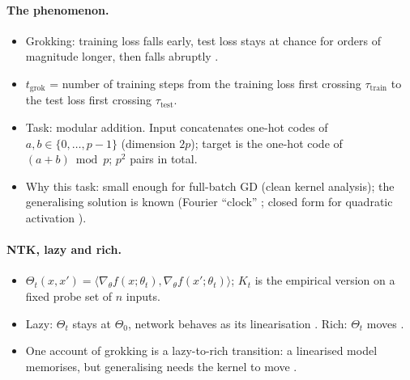 \documentclass[a4paper,11pt]{article} %
\newcommand{\tgrok}{t_{\mathrm{grok}}}
\begin{document}

\paragraph{The phenomenon.}
\begin{itemize}
	\item Grokking: training loss falls early, test loss stays at chance for
		orders of magnitude longer, then falls abruptly \citep{power2022grokking}.
	\item $\tgrok$ = number of training steps from the training loss first
		crossing $\tau_{\mathrm{train}}$ to the test loss first crossing
		$\tau_{\mathrm{test}}$.
	\item Task: modular addition. Input concatenates one-hot codes of
		$a,b\in\{0,\dots,p-1\}$ (dimension $2p$); target is the one-hot code of
		$(a+b)\bmod p$; $p^2$ pairs in total.
	\item Why this task: small enough for full-batch GD (clean kernel analysis);
		the generalising solution is known (Fourier ``clock''
		\citep{nanda2023progress}; closed form for quadratic activation
		\citep{gromov2023grokking}).
\end{itemize}

\paragraph{NTK, lazy and rich.}
\begin{itemize}
	\item $\Theta_t(x,x')=\langle\nabla_\theta f(x;\theta_t),\nabla_\theta
		f(x';\theta_t)\rangle$; $K_t$ is the empirical version on a fixed probe set
		of $n$ inputs.
	\item Lazy: $\Theta_t$ stays at $\Theta_0$, network behaves as its
		linearisation \citep{jacot2018ntk}. Rich: $\Theta_t$ moves
		\citep{chizat2019lazy}.
	\item One account of grokking is a lazy-to-rich transition: a linearised
		model memorises, but generalising needs the kernel to move
		\citep{kumar2024grokking,mohamadi2024grok}.
\end{itemize}
\end{document}
